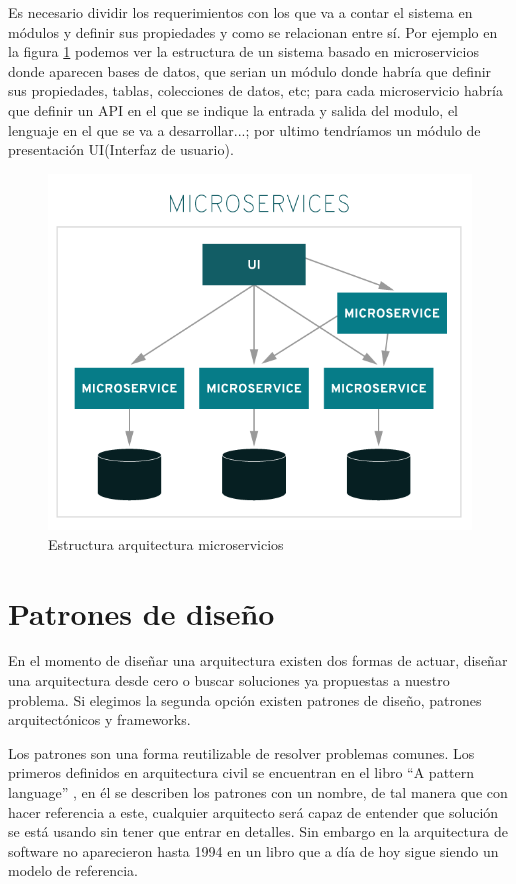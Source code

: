 \documentclass[12pt]{report} %
\begin{document}
	Es necesario dividir los requerimientos con los que va a contar el sistema en módulos y definir sus propiedades y como se relacionan entre sí. Por ejemplo en la figura \ref{fig:microservices} podemos ver la estructura de un sistema basado en microservicios donde aparecen bases de datos, que serian un módulo donde habría que definir sus propiedades, tablas, colecciones de datos, etc; para cada microservicio habría que definir un API en el que se indique la entrada y salida del modulo, el lenguaje en el que se va a desarrollar...; por ultimo tendríamos un módulo de presentación UI(Interfaz de usuario).
	\begin{figure}
		\centering
		\includegraphics[width=0.7\linewidth]{imagenes/monolithic-vs-microservices}
		\caption{Estructura arquitectura microservicios}
		\label{fig:microservices}
	\end{figure}

	\section{Patrones de diseño}
	 En el momento de diseñar una arquitectura existen dos formas de actuar, diseñar una arquitectura desde cero o buscar soluciones ya propuestas a nuestro problema. Si elegimos la segunda opción existen patrones de diseño, patrones arquitectónicos y frameworks.
	 
	 Los patrones son una forma reutilizable de resolver problemas comunes. Los primeros definidos en arquitectura civil se encuentran en el libro “A pattern language” \cite{PatternLanguage}, en él se describen los patrones con un nombre, de tal manera que con hacer referencia a este, cualquier arquitecto será capaz de entender que solución se está usando sin tener que entrar en detalles. Sin embargo en la arquitectura de software no aparecieron hasta 1994 en un libro que a día de hoy sigue siendo un modelo de referencia\cite{gamma2002patrones}.
	 
\end{document}
